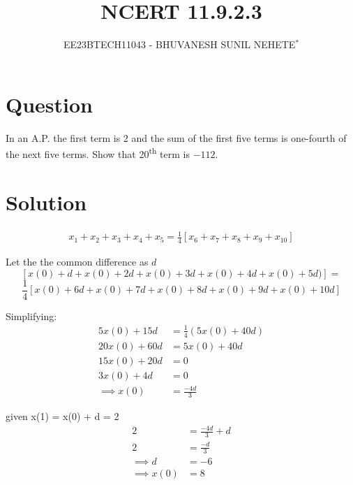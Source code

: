 \documentclass[journal,12pt,twocolumn]{IEEEtran}
\theoremstyle{remark}
\begin{document}

\vspace{3cm}

\title{NCERT 11.9.2.3}
\author{EE23BTECH11043 - BHUVANESH SUNIL NEHETE$^{*}$%
}
\maketitle
\newpage
\bigskip

\renewcommand{\thefigure}{\theenumi}
\renewcommand{\thetable}{\theenumi}



\section*{Question}

In an A.P. the first term is 2 and the sum of the first five terms is one-fourth of the next five terms. Show that 20\textsuperscript{th} term is $-112$.

\section*{Solution}



   \begin{align}
        x_1 + x_2 + x_3 + x_4 + x_5 = \frac{1}{4} [x_6 + x_7 + x_8 + x_9 + x_{10}]
    \end{align}
    
Let the the common difference as \(d\)
\[[x(0) + d + x(0) + 2d + x(0) + 3d + x(0) + 4d + x(0) + 5d)] =\]
\[\frac{1}{4} [x(0) + 6d + x(0) + 7d + x(0) + 8d + x(0) + 9d + x(0) + 10d]\]

Simplifying:
    \begin{align}
        5x(0) + 15d &= \frac{1}{4}(5x(0) + 40d)\\
        20x(0) + 60d &= 5x(0) + 40d\\
        15x(0) + 20d &= 0\\
        3x(0) + 4d &= 0\\ 
        \implies x(0) &= \frac{-4d}{3}
    \end{align}

    given x(1) = x(0) + d = 2
    \begin{align}
        2 &= \frac{-4d}{3} +d\\
        2 &= \frac{-d}{3}\\
        \implies d &= -6\\
        \implies x(0) &= 8
    \end{align}
    
\end{document}
